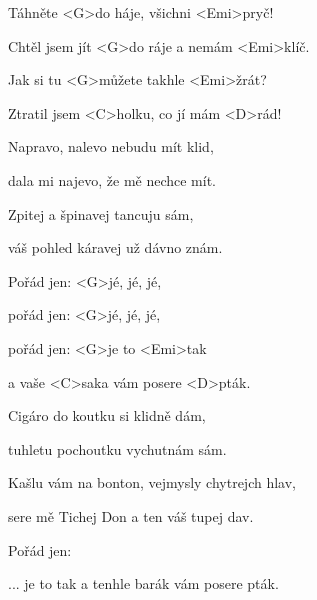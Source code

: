

\zs
Táhněte <G>do háje, všichni <Emi>pryč!

Chtěl jsem jít <G>do ráje a nemám <Emi>klíč.

Jak si tu <G>můžete takhle <Emi>žrát?

Ztratil jsem <C>holku, co jí mám <D>rád!
\ks

\zs
Napravo, nalevo nebudu mít klid,

dala mi najevo, že mě nechce mít.

Zpitej a špinavej tancuju sám,

váš pohled káravej už dávno znám.
\ks

\zr
Pořád jen:  <G>jé, jé, jé,

pořád jen:  <G>jé, jé, jé,

pořád jen:  <G>je to <Emi>tak

a vaše <C>saka vám posere <D>pták.
\kr

\zs
Cigáro do koutku si klidně dám,

tuhletu pochoutku vychutnám sám.

Kašlu vám na bonton, vejmysly chytrejch hlav,

sere mě Tichej Don a ten váš tupej dav.
\ks

\zr \kr

\zr
Pořád jen: 

... je to tak a tenhle barák vám posere pták.
\kr

\kp
